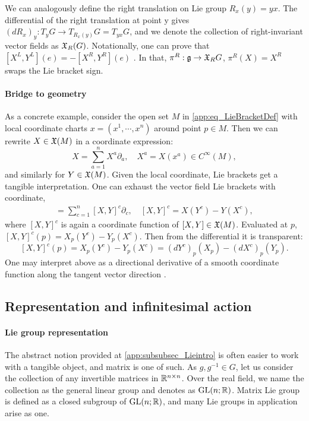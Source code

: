 We can analogously define the right translation on Lie group $R_x(y) = yx$.
The differential of the right translation at point y gives $(dR_x)_y: T_yG \to T_{R_x(y)}G = T_{yx}G$,
and we denote the collection of right-invariant vector fields as $\mathfrak{X}_R(G)$.
Notationally, one can prove that $[X^L, Y^L](e) = -[X^R, Y^R](e)$ \cite{lee2003smooth}.
In that, $\pi^R: \mathfrak{g} \to \mathfrak{X}_RG$, $\pi^R(X) = X^R$ swaps the Lie bracket sign.

\paragraph{Bridge to geometry}
As a concrete example, consider the open set $M$ in \cref{app:eq_LieBracketDef} with local coordinate charts $x=(x^1, \cdots, x^n)$
around point $p \in M$.
Then we can rewrite $X \in \mathfrak{X}(M)$ in a coordinate expression:
\begin{equation*}
    X = \sum_{a=1}^n X^a \partial_a,
    \quad
    X^a = X(x^a) \in C^\infty(M),
\end{equation*}
and similarly for $Y \in \mathfrak{X}(M)$.
Given the local coordinate, Lie brackets get a tangible interpretation.
One can exhaust the vector field Lie brackets with coordinate,
\begin{align*}
    [X,Y] = \sum_{c=1}^n [X,Y]^c \partial_c,
    \quad
    [X,Y]^c = X(Y^c) - Y(X^c),
\end{align*}
where $[X,Y]^c$ is again a coordinate function of $[X,Y] \in \mathfrak{X}(M)$.
Evaluated at $p$, $[X,Y]^c(p) = X_p(Y^c) - Y_p(X^c)$.
Then from the differential it is transparent:
\begin{equation}
\label{app:eq_LieBracket_Directional}
    [X,Y]^c(p) = X_p(Y^c) - Y_p(X^c) = (dY^c)_p(X_p) - (dX^c)_p(Y_p).
\end{equation}
One may interpret above as a directional derivative of a smooth coordinate function
along the tangent vector direction \cite{lee2003smooth}.

\subsection{Representation and infinitesimal action}
\label{app:subsubsec_repprelim}
\paragraph{Lie group representation}
The abstract notion provided at \cref{app:subsubsec_Lieintro} is often easier to work with a tangible object,
and matrix is one of such.
As $g, g^{-1} \in G$, let us consider the collection of any invertible matrices in $\mathbb{R}^{n \times n}$.
Over the real field, we name the collection as the general linear group and denotes as $\text{GL}(n;\mathbb{R})$.
Matrix Lie group is defined as a closed subgroup of $\text{GL}(n;\mathbb{R})$,
and many Lie groups in application arise as one.

